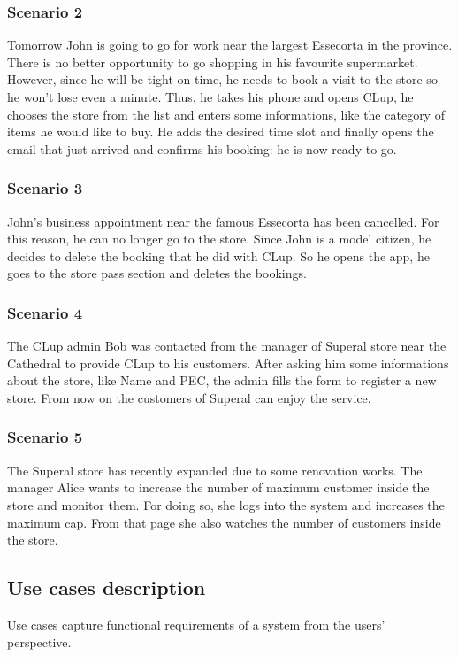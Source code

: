 \subsubsection{Scenario 2}\label{sc:second}
Tomorrow John is going to go for work near the largest Essecorta in the province. There is no better opportunity to go shopping in his favourite supermarket.\newline
However, since he will be tight on time, he needs to book a visit to the store so he won't lose even a minute. Thus, he takes his phone and opens CLup, he chooses the store from the list and enters some informations, like the category of items he would like to buy. He adds the desired time slot and finally opens the email that just arrived and confirms his booking: he is now ready to go.

\subsubsection{Scenario 3}\label{sc:third}
John's business appointment near the famous Essecorta has been cancelled. For this reason, he can no longer go to the store.\newline
Since John is a model citizen, he decides to delete the booking that he did with CLup. So he opens the app, he goes to the store pass section and deletes the bookings.

\subsubsection{Scenario 4}\label{sc:fourth}
The CLup admin Bob was contacted from the manager of Superal store near the Cathedral to provide CLup to his customers. After asking him some informations about the store, like Name and PEC, the admin fills the form to register a new store. From now on the customers of Superal can enjoy the service.

\subsubsection{Scenario 5}\label{sc:fifth}
The Superal store has recently expanded due to some renovation works. The manager Alice wants to increase the number of maximum customer inside the store and monitor them.\newline
For doing so, she logs into the system and increases the maximum cap. From that page she also watches the number of customers inside the store.

\clearpage
\subsection{Use cases description}
Use cases capture functional requirements of a system from the users' perspective.

